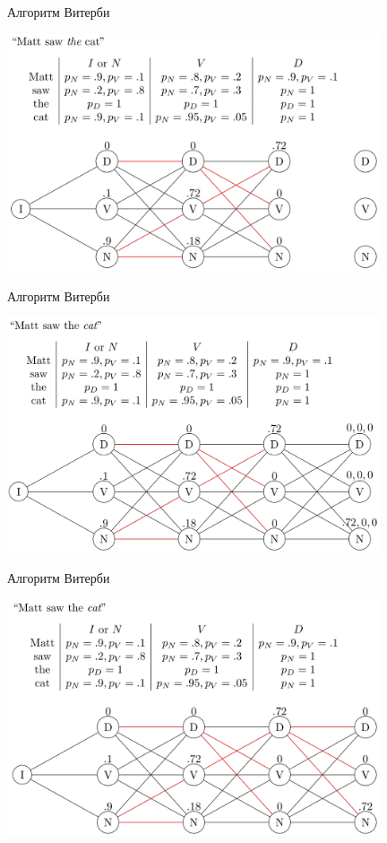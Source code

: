 \documentclass{beamer}
\begin{document}
\begin{frame}{Алгоритм Витерби}
\centerline{\includegraphics[width=11cm]{fig/6.png}}
\end{frame}

\begin{frame}{Алгоритм Витерби}
\centerline{\includegraphics[width=11cm]{fig/7.png}}
\end{frame}

\begin{frame}{Алгоритм Витерби}
\centerline{\includegraphics[width=11cm]{fig/8.png}}
\end{frame}
\end{document}
